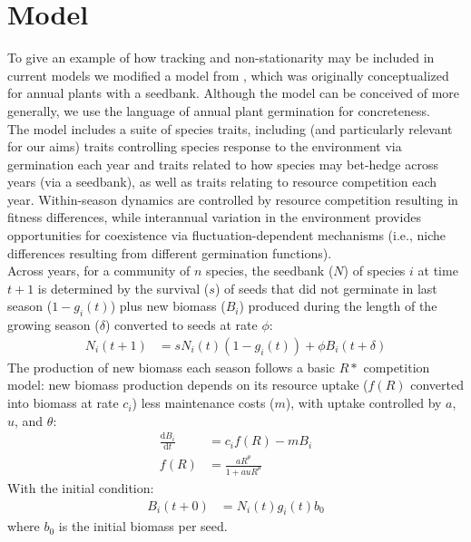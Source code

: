 \documentclass[11pt,letter]{article}
\begin{document}



\newpage 
\clearpage
\section{Model} 
To give an example of how tracking and non-stationarity may be included in current models we modified a model from \citet{Chesson:2004eo}, which was originally conceptualized for annual plants with a seedbank.  Although the model can be conceived of more generally, we use the language of annual plant germination for concreteness. \\

The model includes a suite of species traits, including (and particularly relevant for our aims) traits controlling species response to the environment via germination each year and traits related to how species may bet-hedge across years (via a seedbank), as well as traits relating to resource competition each year. Within-season dynamics are controlled by resource competition resulting in fitness differences, while interannual variation in the environment provides opportunities for coexistence via fluctuation-dependent mechanisms (i.e., niche differences resulting from different germination functions). \\

Across years, for a community of \(n\) species, the seedbank ($N$) of species $i$ at time $t+1$ is determined by the survival ($s$) of seeds that did not germinate in last season ($1-g_{i}(t)$) plus new biomass ($B_i$) produced during the length of the growing season ($\delta$) converted to seeds at rate $\phi$:
\begin{align}
N_{i}(t+1) & =
s N_{i}(t)(1-g_{i}(t))+\phi B_{i}(t+\delta)
\end{align}
The production of new biomass each season follows a basic $R*$ competition model: new biomass production depends on its resource uptake ($f(R)$ converted into biomass at rate $c_i$) less maintenance costs ($m$), with uptake controlled by $a$, $u$, and $\theta$:
\begin{align}
\frac{\mathrm{d}B_i}{\mathrm{d}t} & = c_{i}f(R) - m B_{i} \\
f(R) & = \frac{a R^{\theta}}{1+a uR^{\theta}}
\end{align}
With the initial condition:
\begin{align}
B_{i}(t+0) & = N_{i}(t)g_{i}(t)b_{0}
\end{align}
where $b_{0}$ is the initial biomass per seed.\\
\end{document}
